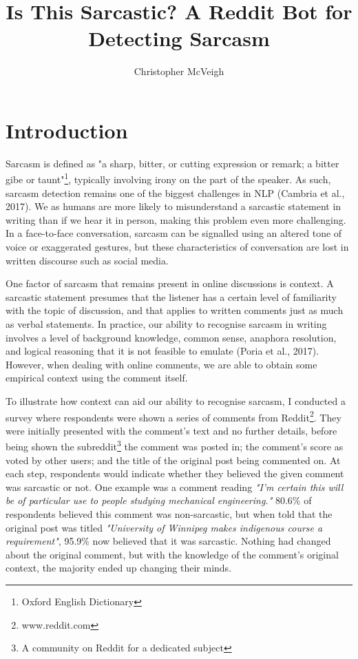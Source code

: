 \documentclass[a4paper,12pt]{article}
\title{Is This Sarcastic? A Reddit Bot for Detecting Sarcasm}
\author{Christopher McVeigh}
\begin{document}

\linespread{1.3}

\thispagestyle{empty}
\setcounter{tocdepth}{2}
\tableofcontents
\thispagestyle{empty}
\clearpage
\setcounter{page}{1}


\section{Introduction}
Sarcasm is defined as "a sharp, bitter, or cutting expression or remark; a bitter gibe or taunt"\footnote{Oxford English Dictionary}, typically involving irony on the part of the speaker. As such, sarcasm detection remains one of the biggest challenges in NLP (Cambria et al., 2017). We as humans are more likely to misunderstand a sarcastic statement in writing than if we hear it in person, making this problem even more challenging. In a face-to-face conversation, sarcasm can be signalled using an altered tone of voice or exaggerated gestures, but these characteristics of conversation are lost in written discourse such as social media.

One factor of sarcasm that remains present in online discussions is context. A sarcastic statement presumes that the listener has a certain level of familiarity with the topic of discussion, and that applies to written comments just as much as verbal statements. In practice, our ability to recognise sarcasm in writing involves a level of background knowledge, common sense, anaphora resolution, and logical reasoning that it is not feasible to emulate (Poria et al., 2017). However, when dealing with online comments, we are able to obtain some empirical context using the comment itself.

To illustrate how context can aid our ability to recognise sarcasm, I conducted a survey where respondents were shown a series of comments from Reddit\footnote{www.reddit.com}. They were initially presented with the comment's text and no further details, before being shown the subreddit\footnote{A community on Reddit for a dedicated subject} the comment was posted in; the comment's score as voted by other users; and the title of the original post being commented on. At each step, respondents would indicate whether they believed the given comment was sarcastic or not. One example was a comment reading \textit{"I'm certain this will be of particular use to people studying mechanical engineering."} 80.6\% of respondents believed this comment was non-sarcastic, but when told that the original post was titled \textit{"University of Winnipeg makes indigenous course a requirement"}, 95.9\% now believed that it was sarcastic. Nothing had changed about the original comment, but with the knowledge of the comment's original context, the majority ended up changing their minds.
\end{document}
